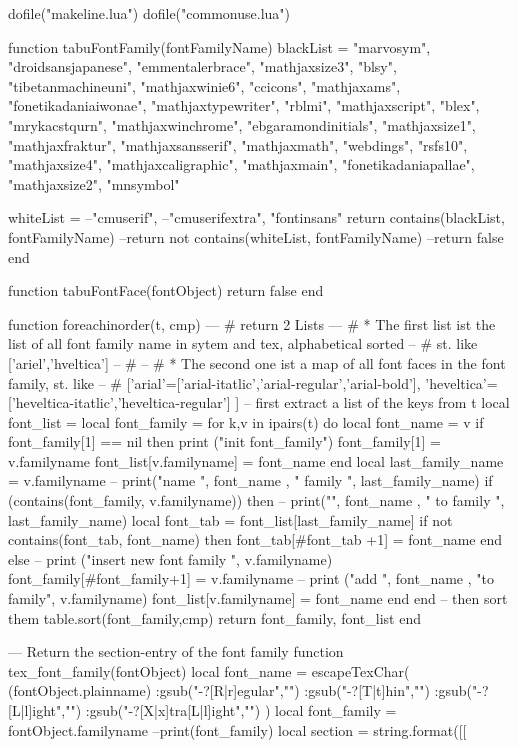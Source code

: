 ﻿\documentclass[12pt,a4paper]{article}
\begin{document}
\begin{luacode*}


dofile("makeline.lua")
dofile("commonuse.lua")

function tabuFontFamily(fontFamilyName)
	blackList ={
		"marvosym",
		"droidsansjapanese",
		"emmentalerbrace",
		"mathjaxsize3",
		"blsy",
		"tibetanmachineuni",
		"mathjaxwinie6",
		"ccicons",
		"mathjaxams",
		"fonetikadaniaiwonae",
		"mathjaxtypewriter",
		"rblmi",
		"mathjaxscript",
		"blex",
		"mrykacstqurn",
		"mathjaxwinchrome",
		"ebgaramondinitials",
		"mathjaxsize1",
		"mathjaxfraktur",
		"mathjaxsansserif",
		"mathjaxmath",
		"webdings",
		"rsfs10",
		"mathjaxsize4",
		"mathjaxcaligraphic",
		"mathjaxmain",
		"fonetikadaniapallae",
		"mathjaxsize2",
		"mnsymbol"	 
	}

	whiteList ={
		--"cmuserif",
		--"cmuserifextra",
		"fontinsans"
	}
	return contains(blackList, fontFamilyName)
	--return not contains(whiteList, fontFamilyName)
	--return false
end
	
function tabuFontFace(fontObject)
	return false
end


function foreachinorder(t, cmp)
	--- # return 2 Lists
	--- # * The first list ist the list of all font family name in sytem and tex, alphabetical sorted
	--  # st. like ['ariel','hveltica']
	--  # 
	--  # * The second one ist a map of all font faces in the font family, st. like
	--  # ['arial'=['arial-itatlic','arial-regular','arial-bold'], 'heveltica'=['heveltica-itatlic','heveltica-regular'] ]
    -- first extract a list of the keys from t
    local font_list = {}
    local font_family = {}
    for k,v in ipairs(t) do
		local font_name = v
		if font_family[1] == nil then
			print ("init font_family")
			font_family[1] = v.familyname
			font_list[v.familyname] = {font_name}
		end
		local last_family_name = v.familyname
		-- print("name ", font_name , " family ", last_family_name)
		if (contains(font_family, v.familyname)) then
			-- print("", font_name , " to family ", last_family_name)
			local font_tab = font_list[last_family_name]
			if not contains(font_tab, font_name) then
				font_tab[#font_tab +1] = font_name
			end
		else
			-- print ("insert new font family ", v.familyname)
			font_family[#font_family+1] = v.familyname
			-- print ("add ", font_name , "to family", v.familyname)
			font_list[v.familyname] = {font_name}
		end
    end
 	-- then sort them   
    table.sort(font_family,cmp)
    return font_family, font_list
end


--- Return the section-entry of the font family
function tex_font_family(fontObject)
	local font_name = escapeTexChar( (fontObject.plainname)
							:gsub("-?[R|r]egular","")
							:gsub("-?[T|t]hin","") 
							:gsub("-?[L|l]ight","") 
							:gsub("-?[X|x]tra[L|l]ight","") 
							)
	local font_family = fontObject.familyname
	--print(font_family)
	local section = string.format([[

\end{luacode*}
\end{document}

